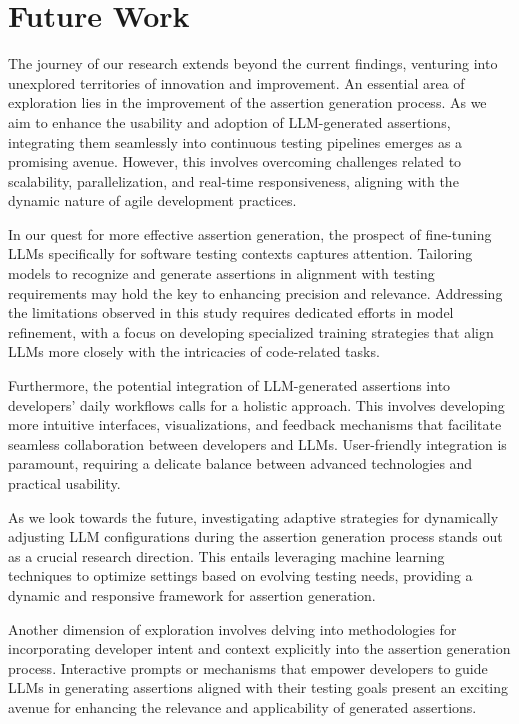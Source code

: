 \section{Future Work}
\label{sec:future_work}
\vspace{0.2 cm}

The journey of our research extends beyond the current findings, venturing into unexplored territories of innovation and improvement. An essential area of exploration lies in the improvement of the assertion generation process. As we aim to enhance the usability and adoption of LLM-generated assertions, integrating them seamlessly into continuous testing pipelines emerges as a promising avenue. However, this involves overcoming challenges related to scalability, parallelization, and real-time responsiveness, aligning with the dynamic nature of agile development practices.

In our quest for more effective assertion generation, the prospect of fine-tuning LLMs specifically for software testing contexts captures attention. Tailoring models to recognize and generate assertions in alignment with testing requirements may hold the key to enhancing precision and relevance. Addressing the limitations observed in this study requires dedicated efforts in model refinement, with a focus on developing specialized training strategies that align LLMs more closely with the intricacies of code-related tasks.

Furthermore, the potential integration of LLM-generated assertions into developers' daily workflows calls for a holistic approach. This involves developing more intuitive interfaces, visualizations, and feedback mechanisms that facilitate seamless collaboration between developers and LLMs. User-friendly integration is paramount, requiring a delicate balance between advanced technologies and practical usability.

As we look towards the future, investigating adaptive strategies for dynamically adjusting LLM configurations during the assertion generation process stands out as a crucial research direction. This entails leveraging machine learning techniques to optimize settings based on evolving testing needs, providing a dynamic and responsive framework for assertion generation.

Another dimension of exploration involves delving into methodologies for incorporating developer intent and context explicitly into the assertion generation process. Interactive prompts or mechanisms that empower developers to guide LLMs in generating assertions aligned with their testing goals present an exciting avenue for enhancing the relevance and applicability of generated assertions.

